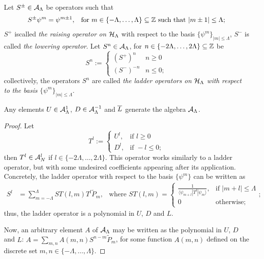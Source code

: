 \begin{definition}
Let $S^\pm \in \mathcal A_{\Lambda}$ be operators such that
\begin{align}
    S^\pm \psi^m &= \psi^{m\pm 1}, & \text{for }m \in \{-\Lambda, \dots, \Lambda\} \subseteq \mathbb{Z} \text{ such that } |m \pm 1| \leq \Lambda;
\end{align}
$S^+$ iscalled \emph{the raising operator on $\mathcal H_\Lambda$} with respect to the basis $\{\psi^m\}_{|m| \leq \Lambda}$,  $S^-$ is called \emph{the lowering operator}. Let $S^n \in \mathcal A_\Lambda$, for $n \in \{-2\Lambda, \dots, 2\Lambda\} \subseteq \mathbb{Z}$ be
\begin{equation}
    S^n := \begin{cases}
    (S^+)^n & n \geq 0\\
    (S^-)^{-n} & n \leq 0;
    \end{cases}
\end{equation}
collectively, the operators $S^n$ are called \textit{the ladder operators on $\mathcal H_\Lambda$ with respect to the basis $\{\psi^m\}_{|m|\leq \Lambda}$}.
\end{definition}

\begin{lemma}\label{lemmaLUDScalarAngularMomentumGenerateD2}
Any elements $U \in \mathcal A^1_\Lambda$, $D \in \mathcal A^{-1}_\Lambda$ and $\overline{L}$ generate the algebra $\mathcal A_\Lambda$.
\end{lemma}
\begin{proof}
Let
\begin{equation*}
    T^l := 
    \begin{cases}
    U^l, &   \text{if } l \geq 0\\
    D^l, &   \text{if } -l \leq 0;
    \end{cases}
\end{equation*}
then $T^l \in \mathcal A_N^l$ if $l \in \{-2\Lambda, \dots, 2\Lambda\}$. This operator works similarly to a ladder operator, but with some undesired coefficients appearing after its application. Concretely, the ladder operator with respect to the basis $\{\psi^m\}$ can be written as
\begin{align}\label{equationFormulaGeneralLadderOperatorD2}
    S^l &= \sum_{m = -\Lambda}^\Lambda ST(l,m) T^l \tilde P_m, & \text{where }
    ST(l,m) =
        \begin{cases}
        \frac{1}{\langle \psi_{m+l}| T^l | \psi_{m}\rangle}, & \text{if } |m+l| \leq \Lambda\\
        0 & \text{otherwise;}
        \end{cases};
\end{align}
thus, the ladder operator is a polynomial in $U$, $D$ and $L$.

Now, an arbitrary element $A$ of $\mathcal A_\Lambda$ may be written as the polynomial in $U$, $D$ and $L$: $A =\sum_{m,n} A(m,n) S^{n-m} \tilde P_m$, for some function $A(m,n)$ defined on the discrete set $m,n \in \{-\Lambda, \dots, \Lambda\}$.
\end{proof}

